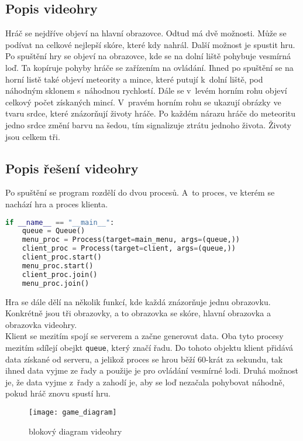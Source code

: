 \documentclass[12pt]{report}			%
\begin{document}
\subsection{Popis videohry}
Hráč se nejdříve objeví na hlavní obrazovce. Odtud má dvě možnosti. Může se podívat na celkové nejlepší skóre, které kdy nahrál. Další možnost je spustit hru. Po spuštění hry se objeví na obrazovce, kde se na dolní liště pohybuje vesmírná loď. Ta kopíruje pohyby hráče se zařízením na ovládání. Ihned po spuštění se na horní listě také objeví meteority a mince, které putují k~dolní liště, pod náhodným sklonem s~náhodnou rychlostí. Dále se v~levém horním rohu objeví celkový počet získaných mincí. V~pravém horním rohu se ukazují obrázky ve tvaru srdce, které znázorňují životy hráče. Po každém nárazu hráče do meteoritu jedno srdce změní barvu na šedou, tím signalizuje ztrátu jednoho života. Životy jsou celkem tři. 


\subsection{Popis řešení videohry}
Po spuštění se program rozdělí do dvou procesů. A~to proces, ve kterém se nachází hra a proces klienta. 

\begin{lstlisting}[title={Program game.py}, caption={game.py}, language=Python]
if __name__ == "__main__":
    queue = Queue() 
    menu_proc = Process(target=main_menu, args=(queue,)) 
    client_proc = Process(target=client, args=(queue,))  
    client_proc.start()
    menu_proc.start()
    client_proc.join()
    menu_proc.join()
\end{lstlisting}

Hra se dále dělí na několik funkcí, kde každá znázorňuje jednu obrazovku. Konkrétně jsou tři obrazovky, a to obrazovka se skóre, hlavní obrazovka a obrazovka videohry.
\\
Klient se mezitím spojí se serverem a začne generovat data. Oba tyto procesy mezitím sdílejí obejkt \texttt{queue}, který značí řadu. Do tohoto objektu klient přidává data získané od serveru, a jelikož proces se hrou běží 60-krát za sekundu, tak ihned data vyjme ze řady a použije je pro ovládání vesmírné lodi. Druhá možnost je, že data vyjme z~řady a zahodí je, aby se loď nezačala pohybovat náhodně, pokud hráč znovu spustí hru.


\begin{figure}[h]
\caption{blokový diagram videohry}
\centering
\texttt{[image: game\_diagram]}
\end{figure}
\end{document}
